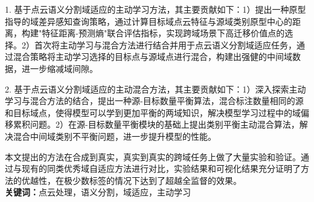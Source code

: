 
1. 基于点云语义分割域适应的主动学习方法，其主要贡献如下：1）提出一种原型指导的域差异感知查询策略，通过计算目标域点云特征与源域类别原型中心的距离，构建"特征距离-预测熵"联合评估指标，实现跨域场景下高迁移价值点的选择。2）首次将主动学习与混合方法进行结合并用于点云语义分割域适应任务，通过混合策略将主动学习选择的目标点与源域点进行混合，构建出强健的中间域数据，进一步缩减域间隙。

2. 基于点云语义分割域适应的主动混合方法，其主要贡献如下：1）深入探索主动学习与混合方法的结合，提出一种源-目标数量平衡算法，混合标注数量相同的源和目标域点，使得模型可以学到更加平衡的两域知识，解决模型学习过程中的域偏移累积问题。2）在源-目标数量平衡模块的基础上提出类别平衡主动混合算法，解决混合中间域类别不平衡问题，进一步提升模型的性能。

本文提出的方法在合成到真实，真实到真实的跨域任务上做了大量实验和验证。通过与现有的同类优秀域自适应方法进行对比，实验结果和可视化结果充分证明了方法的优越性，在极少数标签的情况下达到了超越全监督的效果。\\

\noindent\songti\textbf{关键词：}点云处理，语义分割，域适应，主动学习

\clearpage
